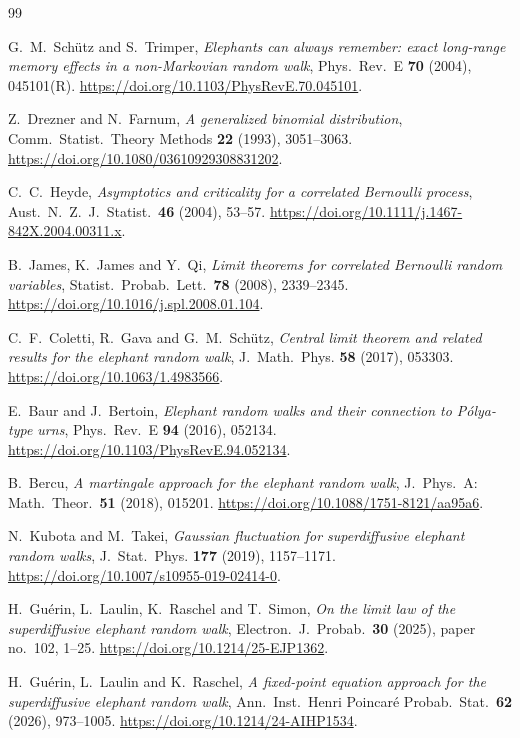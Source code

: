 \begin{thebibliography}{99}\small\setlength{\baselineskip}{11pt}\setlength{\itemsep}{0pt}\setlength{\parsep}{0pt}

G.~M.~Sch\"utz and S.~Trimper, \emph{Elephants can always remember: exact
long-range memory effects in a non-Markovian random walk}, Phys.\ Rev.\ E
\textbf{70} (2004), 045101(R).
\url{https://doi.org/10.1103/PhysRevE.70.045101}.

Z.~Drezner and N.~Farnum, \emph{A generalized binomial distribution},
Comm.\ Statist.\ Theory Methods \textbf{22} (1993), 3051--3063.
\url{https://doi.org/10.1080/03610929308831202}.

C.~C.~Heyde, \emph{Asymptotics and criticality for a correlated Bernoulli
process}, Aust.\ N.\ Z.\ J.\ Statist.\ \textbf{46} (2004), 53--57.
\url{https://doi.org/10.1111/j.1467-842X.2004.00311.x}.

B.~James, K.~James and Y.~Qi, \emph{Limit theorems for correlated Bernoulli
random variables}, Statist.\ Probab.\ Lett.\ \textbf{78} (2008), 2339--2345.
\url{https://doi.org/10.1016/j.spl.2008.01.104}.

C.~F.~Coletti, R.~Gava and G.~M.~Sch\"utz, \emph{Central limit theorem and
related results for the elephant random walk}, J.~Math.~Phys. \textbf{58}
(2017), 053303.
\url{https://doi.org/10.1063/1.4983566}.

E.~Baur and J.~Bertoin, \emph{Elephant random walks and their
connection to P\'olya-type urns}, Phys.\ Rev.\ E \textbf{94}
(2016), 052134. \url{https://doi.org/10.1103/PhysRevE.94.052134}.

B.~Bercu, \emph{A martingale approach for the elephant random walk},
J.\ Phys.\ A: Math.\ Theor.\ \textbf{51} (2018), 015201.
\url{https://doi.org/10.1088/1751-8121/aa95a6}.

N.~Kubota and M.~Takei, \emph{Gaussian fluctuation for superdiffusive
elephant random walks}, J.~Stat.~Phys. \textbf{177} (2019), 1157--1171.
\url{https://doi.org/10.1007/s10955-019-02414-0}.

H.~Gu\'erin, L.~Laulin, K.~Raschel and T.~Simon, \emph{On the limit law of
the superdiffusive elephant random walk}, Electron.\ J.\ Probab.\
\textbf{30} (2025), paper no.~102, 1--25. \url{https://doi.org/10.1214/25-EJP1362}.

H.~Gu\'erin, L.~Laulin and K.~Raschel, \emph{A fixed-point equation approach
for the superdiffusive elephant random walk}, Ann.\ Inst.\ Henri Poincar\'e
Probab.\ Stat.\ \textbf{62} (2026), 973--1005.
\url{https://doi.org/10.1214/24-AIHP1534}.


\end{thebibliography}
